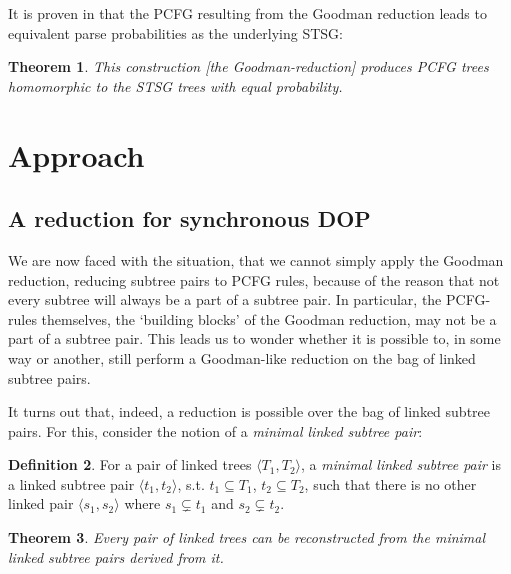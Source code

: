 \documentclass[a4paper]{article}
\newtheorem{theorem}{Theorem}[section]
\theoremstyle{definition}
\newtheorem{definition}[theorem]{Definition}
\begin{document}
It is proven in \cite{Go} that the PCFG resulting from the Goodman reduction leads to equivalent parse probabilities as the underlying STSG:

\begin{theorem}
This construction [the Goodman-reduction] produces PCFG trees homomorphic to the STSG trees with equal probability.
\end{theorem}

\section{Approach}

\subsection{A reduction for synchronous DOP}

We are now faced with the situation, that we cannot simply apply the Goodman reduction, reducing subtree pairs to PCFG rules, because of the reason that not every subtree will always be a part of a subtree pair. In particular, the PCFG-rules themselves, the `building blocks' of the Goodman reduction, may not be a part of a subtree pair. This leads us to wonder whether it is possible to, in some way or another, still perform a Goodman-like reduction on the bag of linked subtree pairs.

It turns out that, indeed, a reduction is possible over the bag of linked subtree pairs. For this, consider the notion of a \emph{minimal linked subtree pair}:

\begin{definition}
For a pair of linked trees $\langle T_1, T_2 \rangle$, a \emph{minimal linked subtree pair} is a linked subtree pair $\langle t_1, t_2 \rangle$, s.t. $t_1 \subseteq T_1$, $t_2 \subseteq T_2$, such that there is no other linked pair $\langle s_1, s_2 \rangle$ where $s_1 \subsetneq t_1$ and $s_2 \subsetneq t_2$.
\end{definition}

\begin{theorem}
Every pair of linked trees can be reconstructed from the minimal linked subtree pairs derived from it.
\end{theorem}
\end{document}
